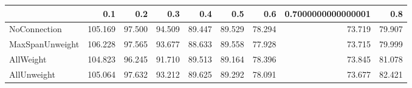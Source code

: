 \begin{tabular}{lrrrrrrrr}
\toprule
{} &     0.1 &    0.2 &    0.3 &    0.4 &    0.5 &    0.6 & 0.7000000000000001 &    0.8 \\
\midrule
NoConnection    & 105.169 & 97.500 & 94.509 & 89.447 & 89.529 & 78.294 &             73.719 & 79.907 \\
MaxSpanUnweight & 106.228 & 97.565 & 93.677 & 88.633 & 89.558 & 77.928 &             73.715 & 79.999 \\
AllWeight       & 104.823 & 96.245 & 91.710 & 89.513 & 89.164 & 78.396 &             73.845 & 81.078 \\
AllUnweight     & 105.064 & 97.632 & 93.212 & 89.625 & 89.292 & 78.091 &             73.677 & 82.421 \\
\bottomrule
\end{tabular}
